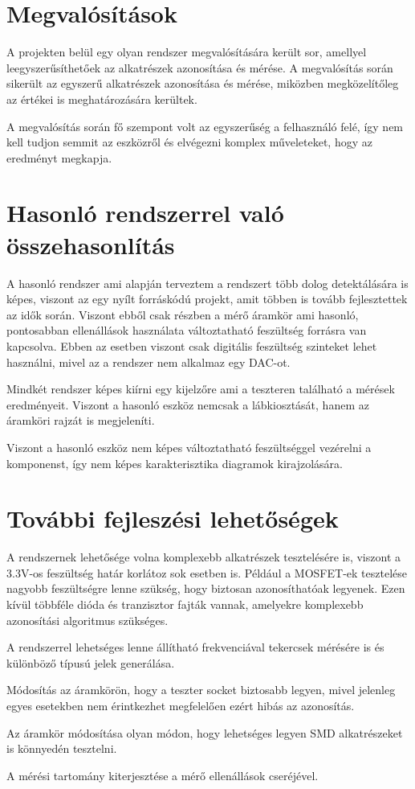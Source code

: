 \section{Megvalósítások}

A projekten belül egy olyan rendszer megvalósítására került sor,
amellyel leegyszerűsíthetőek az alkatrészek azonosítása és mérése.
A megvalósítás során sikerült az egyszerű alkatrészek azonosítása
és mérése, miközben megközelítőleg az értékei is meghatározására
kerültek.

A megvalósítás során fő szempont volt az egyszerűség a felhasználó felé,
így nem kell tudjon semmit az eszközről és elvégezni komplex műveleteket,
hogy az eredményt megkapja. 


\section{Hasonló rendszerrel való összehasonlítás}

A hasonló rendszer ami alapján terveztem a rendszert \cite{similarSystem}
több dolog detektálására is képes, viszont az egy nyílt forráskódú
projekt, amit többen is tovább fejlesztettek az idők során. Viszont
ebből csak részben a mérő áramkör ami hasonló, pontosabban ellenállások
használata változtatható feszültség forrásra van kapcsolva. 
Ebben az esetben viszont csak digitális feszültség szinteket lehet
használni, mivel az a rendszer nem alkalmaz egy DAC-ot.

Mindkét rendszer képes kiírni egy kijelzőre ami a teszteren található
a mérések eredményeit. Viszont a hasonló eszköz nemcsak a lábkiosztását,
hanem az áramköri rajzát is megjeleníti.

Viszont a hasonló eszköz nem képes változtatható feszültséggel vezérelni a
komponenst, így nem képes karakterisztika diagramok kirajzolására.

\section{További fejleszési lehetőségek}

A rendszernek lehetősége volna komplexebb alkatrészek
tesztelésére is, viszont a 3.3V-os feszültség határ
korlátoz sok esetben is. Például a MOSFET-ek tesztelése nagyobb
feszültségre lenne szükség, hogy biztosan azonosíthatóak legyenek.
Ezen kívül többféle dióda és tranzisztor fajták vannak, 
amelyekre komplexebb azonosítási algoritmus szükséges.

A rendszerrel lehetséges lenne állítható frekvenciával tekercsek mérésére
is és különböző típusú jelek generálása.

Módosítás az áramkörön, hogy a teszter socket biztosabb legyen, mivel
jelenleg egyes esetekben nem érintkezhet megfelelően ezért hibás az azonosítás.

Az áramkör módosítása olyan módon, hogy lehetséges legyen SMD alkatrészeket
is könnyedén tesztelni.

A mérési tartomány kiterjesztése a mérő ellenállások cseréjével.



